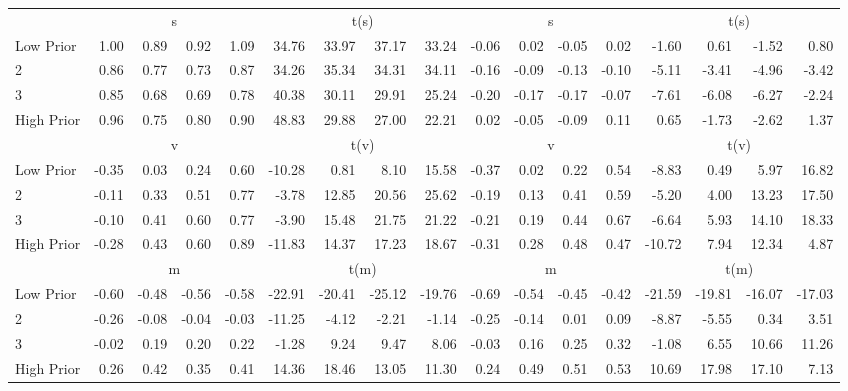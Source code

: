\begin{table}[!ht]
\begin{tabular}{lrrrrrrrrrrrrrrrr}
  
     & \multicolumn{4}{c}{s} & \multicolumn{4}{c}{t(s)}  & \multicolumn{4}{c}{s} & \multicolumn{4}{c}{t(s)}   \\
     \cmidrule(r){2-5} \cmidrule(r){6-9}  \cmidrule(r){10-13} \cmidrule(r){14-17} 
    Low Prior  & 1.00  & 0.89  & 0.92  & 1.09  & 34.76  & 33.97  & 37.17  & 33.24  & -0.06  & 0.02  & -0.05  & 0.02  & -1.60  & 0.61  & -1.52  & 0.80   \\
    2  & 0.86  & 0.77  & 0.73  & 0.87  & 34.26  & 35.34  & 34.31  & 34.11  & -0.16  & -0.09  & -0.13  & -0.10  & -5.11  & -3.41  & -4.96  & -3.42   \\
    3  & 0.85  & 0.68  & 0.69  & 0.78  & 40.38  & 30.11  & 29.91  & 25.24  & -0.20  & -0.17  & -0.17  & -0.07  & -7.61  & -6.08  & -6.27  & -2.24   \\
    High Prior  & 0.96  & 0.75  & 0.80  & 0.90  & 48.83  & 29.88  & 27.00  & 22.21  & 0.02  & -0.05  & -0.09  & 0.11  & 0.65  & -1.73  & -2.62  & 1.37   \\
    
  
     & \multicolumn{4}{c}{v} & \multicolumn{4}{c}{t(v)}  & \multicolumn{4}{c}{v} & \multicolumn{4}{c}{t(v)}   \\
     \cmidrule(r){2-5} \cmidrule(r){6-9}  \cmidrule(r){10-13} \cmidrule(r){14-17} 
    Low Prior  & -0.35  & 0.03  & 0.24  & 0.60  & -10.28  & 0.81  & 8.10  & 15.58  & -0.37  & 0.02  & 0.22  & 0.54  & -8.83  & 0.49  & 5.97  & 16.82   \\
    2  & -0.11  & 0.33  & 0.51  & 0.77  & -3.78  & 12.85  & 20.56  & 25.62  & -0.19  & 0.13  & 0.41  & 0.59  & -5.20  & 4.00  & 13.23  & 17.50   \\
    3  & -0.10  & 0.41  & 0.60  & 0.77  & -3.90  & 15.48  & 21.75  & 21.22  & -0.21  & 0.19  & 0.44  & 0.67  & -6.64  & 5.93  & 14.10  & 18.33   \\
    High Prior  & -0.28  & 0.43  & 0.60  & 0.89  & -11.83  & 14.37  & 17.23  & 18.67  & -0.31  & 0.28  & 0.48  & 0.47  & -10.72  & 7.94  & 12.34  & 4.87   \\
    
  
     & \multicolumn{4}{c}{m} & \multicolumn{4}{c}{t(m)}  & \multicolumn{4}{c}{m} & \multicolumn{4}{c}{t(m)}   \\
     \cmidrule(r){2-5} \cmidrule(r){6-9}  \cmidrule(r){10-13} \cmidrule(r){14-17} 
    Low Prior  & -0.60  & -0.48  & -0.56  & -0.58  & -22.91  & -20.41  & -25.12  & -19.76  & -0.69  & -0.54  & -0.45  & -0.42  & -21.59  & -19.81  & -16.07  & -17.03   \\
    2  & -0.26  & -0.08  & -0.04  & -0.03  & -11.25  & -4.12  & -2.21  & -1.14  & -0.25  & -0.14  & 0.01  & 0.09  & -8.87  & -5.55  & 0.34  & 3.51   \\
    3  & -0.02  & 0.19  & 0.20  & 0.22  & -1.28  & 9.24  & 9.47  & 8.06  & -0.03  & 0.16  & 0.25  & 0.32  & -1.08  & 6.55  & 10.66  & 11.26   \\
    High Prior  & 0.26  & 0.42  & 0.35  & 0.41  & 14.36  & 18.46  & 13.05  & 11.30  & 0.24  & 0.49  & 0.51  & 0.53  & 10.69  & 17.98  & 17.10  & 7.13   \\
    

\end{tabular}
\end{table}
